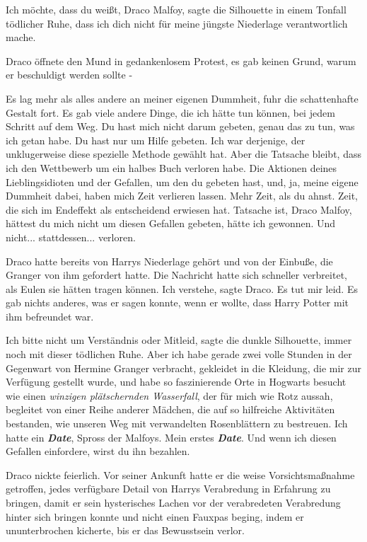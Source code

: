\glqq{}Ich möchte, dass du weißt, Draco Malfoy\grqq{}, sagte die Silhouette in
einem Tonfall tödlicher Ruhe, \glqq{}dass ich dich nicht für meine jüngste
Niederlage verantwortlich mache.\grqq{}

Draco öffnete den Mund in gedankenlosem Protest, es gab keinen Grund, warum er
beschuldigt werden sollte -

\glqq{}Es lag mehr als alles andere an meiner eigenen Dummheit\grqq{}, fuhr die
schattenhafte Gestalt fort. \glqq{}Es gab viele andere Dinge, die ich hätte tun
können, bei jedem Schritt auf dem Weg. Du hast mich nicht darum gebeten, genau
das zu tun, was ich getan habe. Du hast nur um Hilfe gebeten. Ich war derjenige,
der unklugerweise diese spezielle Methode gewählt hat. Aber die Tatsache bleibt,
dass ich den Wettbewerb um ein halbes Buch verloren habe. Die Aktionen deines
Lieblingsidioten und der Gefallen, um den du gebeten hast, und, ja, meine eigene
Dummheit dabei, haben mich Zeit verlieren lassen. Mehr Zeit, als du ahnst. Zeit,
die sich im Endeffekt als entscheidend erwiesen hat. Tatsache ist, Draco Malfoy,
hättest du mich nicht um diesen Gefallen gebeten, hätte ich gewonnen. Und
nicht... stattdessen... verloren.\grqq{}

Draco hatte bereits von Harrys Niederlage gehört und von der Einbuße, die
Granger von ihm gefordert hatte. Die Nachricht hatte sich schneller verbreitet,
als Eulen sie hätten tragen können. \glqq{}Ich verstehe\grqq{}, sagte Draco.
\glqq{}Es tut mir leid.\grqq{} Es gab nichts anderes, was er sagen konnte, wenn
er wollte, dass Harry Potter mit ihm befreundet war.

\glqq{}Ich bitte nicht um Verständnis oder Mitleid\grqq{}, sagte die dunkle
Silhouette, immer noch mit dieser tödlichen Ruhe. \glqq{}Aber ich habe gerade
zwei volle Stunden in der Gegenwart von Hermine Granger verbracht, gekleidet in
die Kleidung, die mir zur Verfügung gestellt wurde, und habe so faszinierende
Orte in Hogwarts besucht wie einen \emph{winzigen plätschernden Wasserfall}, der
für mich wie Rotz aussah, begleitet von einer Reihe anderer Mädchen, die auf so
hilfreiche Aktivitäten bestanden, wie unseren Weg mit verwandelten Rosenblättern
zu bestreuen. Ich hatte ein \textbf{\emph{Date}}, Spross der Malfoys. Mein
erstes \textbf{\emph{Date}}. Und wenn ich diesen Gefallen einfordere, wirst du
ihn bezahlen.\grqq{}

Draco nickte feierlich. Vor seiner Ankunft hatte er die weise Vorsichtsmaßnahme
getroffen, jedes verfügbare Detail von Harrys Verabredung in Erfahrung zu
bringen, damit er sein hysterisches Lachen vor der verabredeten Verabredung
hinter sich bringen konnte und nicht einen Fauxpas beging, indem er
ununterbrochen kicherte, bis er das Bewusstsein verlor.

